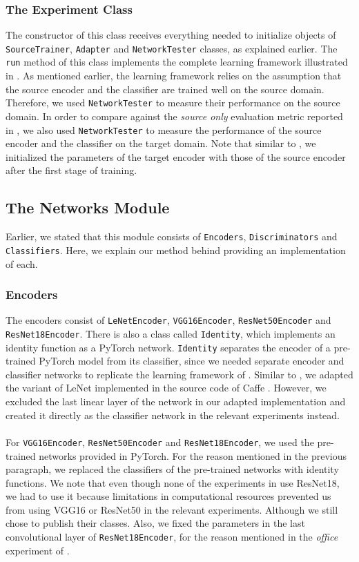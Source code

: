 \documentclass[14pt]{extarticle}
\begin{document}
		\subsubsection{The Experiment Class}
		The constructor of this class receives everything needed to initialize objects of \texttt{SourceTrainer}, \texttt{Adapter} and \texttt{NetworkTester} classes, as explained earlier. The \texttt{run} method of this class implements the complete learning framework illustrated in \cite{adda}. As mentioned earlier, the learning framework relies on the assumption that the source encoder and the classifier are trained well on the source domain. Therefore, we used \texttt{NetworkTester} to measure their performance on the source domain. In order to compare against the \textit{source only} evaluation metric reported in \cite{adda}, we also used \texttt{NetworkTester} to measure the performance of the source encoder and the classifier on the target domain. Note that similar to \cite{adda}, we initialized the parameters of the target encoder with those of the source encoder after the first stage of training.
		\subsection{The Networks Module}
		Earlier, we stated that this module consists of \texttt{Encoders}, \texttt{Discriminators} and \texttt{Classifiers}. Here, we explain our method behind providing an implementation of each.
		\subsubsection{Encoders}
		The encoders consist of \texttt{LeNetEncoder}, \texttt{VGG16Encoder}, \texttt{ResNet50Encoder} and \texttt{ResNet18Encoder}. There is also a class called \texttt{Identity}, which implements an identity function as a PyTorch network. \texttt{Identity} separates the encoder of a pre-trained PyTorch model from its classifier, since we needed separate encoder and classifier networks to replicate the learning framework of \cite{adda}. Similar to \cite{adda}, we adapted the variant of LeNet implemented in the source code of Caffe \cite{CaffeLeNet}. However, we excluded the last linear layer of the network in our adapted implementation and created it directly as the classifier network in the relevant experiments instead.\\\\
		For \texttt{VGG16Encoder}, \texttt{ResNet50Encoder} and \texttt{ResNet18Encoder}, we used the pre-trained networks provided in PyTorch. For the reason mentioned in the previous paragraph, we replaced the classifiers of the pre-trained networks with identity functions. We note that even though none of the experiments in \cite{adda} use ResNet18, we had to use it because limitations in computational resources prevented us from using VGG16 or ResNet50 in the relevant experiments. Although we still chose to publish their classes. Also, we fixed the parameters in the last convolutional layer of \texttt{ResNet18Encoder}, for the reason mentioned in the \textit{office} experiment of \cite{adda}.
\end{document}
